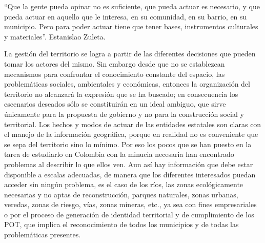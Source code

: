 \begin{multicols}{2}



\vspace{2mm}
\begin{entradilla} %
{\em {\color{introcolor}{CONSTRUIR, SIEMPRE}} \begin{center}{``Que la gente pueda opinar no es suficiente, que pueda actuar es necesario, y que pueda actuar en aquello que le interesa, en su comunidad, en su barrio, en su municipio. Pero para poder actuar tiene que tener bases, instrumentos culturales y materiales''.
Estanislao Zuleta.}
\end{center}
}
\end{entradilla}

La gestión del territorio se logra a partir de las diferentes decisiones que pueden tomar los actores del mismo. Sin embargo desde que no se establezcan mecanismos para confrontar el conocimiento constante del espacio, las problemáticas sociales, ambientales y económicas, entonces la organización del territorio no alcanzará la expresión que se ha buscado; en consecuencia los escenarios deseados sólo se constituirán en un ideal ambiguo, que sirve únicamente para la propuesta de gobierno y no para  la construcción social y territorial. 
Los hechos y modos de actuar de las entidades estatales son claras con el manejo de la información geográfica, porque en realidad no es conveniente que se sepa del territorio sino lo mínimo. Por eso los pocos que se han puesto en la tarea de estudiarlo en Colombia con la minucia necesaria han encontrado problemas al describir lo que ellos ven.  Aun así hay información que debe estar disponible a escalas adecuadas, de manera que los diferentes interesados puedan acceder sin ningún problema, es el caso de los ríos, las zonas ecológicamente necesarias y no aptas de reconstrucción, parques naturales, zonas urbanas, veredas, zonas de riesgo, vías, zonas mineras, etc., ya sea con fines empresariales o por el proceso de generación de identidad territorial y de cumplimiento de los POT, que implica el reconocimiento de todos los municipios y de todas las problemáticas presentes.


\end{multicols}

